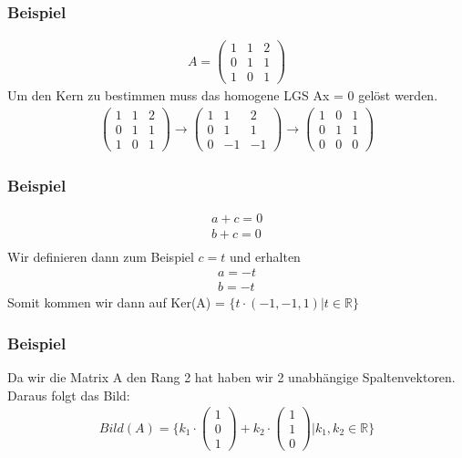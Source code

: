 \begin{frame}
	\frametitle{Beispiel}
	\begin{align*}
		A = \begin{pmatrix}
			1 & 1 & 2 \\
			0 & 1 & 1 \\
			1 & 0 & 1 
		\end{pmatrix}
	\end{align*}
	Um den Kern zu bestimmen muss das homogene LGS Ax = 0 gelöst werden.
	\begin{align*}
		\begin{pmatrix}
			1 & 1 & 2 \\
			0 & 1 & 1 \\
			1 & 0 & 1 
		\end{pmatrix} \rightarrow
		\begin{pmatrix}
			1 & 1 & 2 \\
			0 & 1 & 1 \\
			0 & -1 & -1 
		\end{pmatrix} \rightarrow
		\begin{pmatrix}
			1 & 0 & 1 \\
			0 & 1 & 1 \\
			0 & 0 & 0 
		\end{pmatrix} 
	\end{align*}
\end{frame}

\begin{frame}
	\frametitle{Beispiel}
	\begin{align*}
		a + c = 0 \\
		b + c = 0 \\
	\end{align*}
	Wir definieren dann zum Beispiel $c = t$ und erhalten
	\begin{align*}
		a = -t \\
		b = -t
	\end{align*}
	Somit kommen wir dann auf Ker(A) =
	$\{t \cdot (-1, -1, 1) | t \in \mathbb{R}\}$
\end{frame}

\begin{frame}
	\frametitle{Beispiel}
	Da wir die Matrix A den Rang 2 hat haben wir 2 unabhängige Spaltenvektoren.
	Daraus folgt das Bild:
	\begin{align*}
		Bild(A) = \{k_1 \cdot \begin{pmatrix}
			1 \\
			0 \\
			1
		\end{pmatrix} + k_2 \cdot \begin{pmatrix}
			1 \\
			1 \\
			0
		\end{pmatrix} | k_1, k_2 \in \mathbb{R}\}
	\end{align*}
\end{frame}

